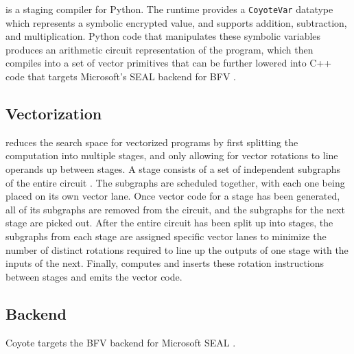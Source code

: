 \system is a staging compiler for Python.
The runtime provides a \texttt{CoyoteVar} datatype which represents a symbolic encrypted value, and supports addition, subtraction, and multiplication.
Python code that manipulates these symbolic variables produces an arithmetic circuit representation of the program, which \system then compiles into a set of vector primitives that can be further lowered into C++ code that targets Microsoft's SEAL backend for BFV .


 
\subsection{Vectorization}
\system reduces the search space for vectorized programs  by first splitting the computation into multiple stages, and only allowing for vector rotations to line operands up between stages.
A stage consists of a set of independent subgraphs of the entire circuit . 
The subgraphs are scheduled together, with each one being placed on its own vector lane. 
Once vector code for a stage has been generated, all of its subgraphs are removed from the circuit, and the subgraphs for the next stage are picked out.
After the entire circuit has been split up into stages, the subgraphs from each stage are assigned specific vector lanes to minimize the number of distinct rotations required to line up the outputs of one stage with the inputs of the next.
Finally, \system computes and inserts these rotation instructions between stages and emits the vector code.

\subsection{Backend}
Coyote targets the BFV backend for Microsoft SEAL .